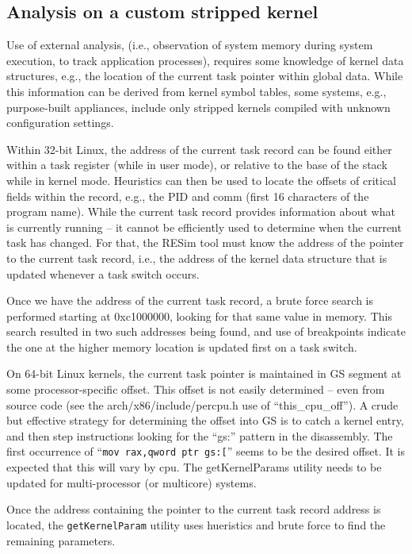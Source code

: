 \documentclass[titlepage]{article}
\begin{document}
\pagebreak
\begin{appendices}
\section{Analysis on a custom stripped kernel}
Use of external analysis, (i.e., observation of system memory during system execution, to track application processes), requires some knowledge of kernel data structures, e.g., the location of the current task pointer within global data.   While this information can be derived from kernel symbol tables, some systems, e.g., purpose-built appliances, include only stripped kernels compiled with unknown configuration settings.

Within 32-bit Linux, the address of the current task record can be found either within a task register (while in user mode), or relative to the base of the stack while in kernel mode.  Heuristics can then be used to locate the offsets of critical fields within the record, e.g., the PID and comm (first 16 characters of the program name).  While the current task record provides information about what is currently running – it cannot be efficiently used to determine when the current task has changed.  For that, the RESim tool must know the address of the pointer to the current task record, i.e., the address of the kernel data structure that is updated whenever a task switch occurs.

Once we have the address of the current task record, a brute force search is performed starting at 0xc1000000, looking for that same value in memory.  This search resulted in two such addresses being found, and use of breakpoints indicate the one at the higher memory location is updated first on a task switch. 

On 64-bit Linux kernels, the current task pointer is maintained in GS segment at some processor-specific offset.  This offset is not easily determined – even from source code (see the arch/x86/include/percpu.h use of “this\_cpu\_off”).  A crude but effective strategy for determining the offset into GS is to catch a kernel entry, and then step instructions looking for the ``gs:'' pattern in the disassembly.  The first occurrence of ``{\tt mov rax,qword ptr gs:[}''  seems to be the desired offset.  It is expected that this will vary by cpu. The getKernelParams utility needs to be updated for multi-processor (or multicore) systems.

Once the address containing the pointer to the current task record address is located, the {\tt getKernelParam} utility uses hueristics and brute force to
find the remaining parameters.


\end{appendices}
\end{document}
